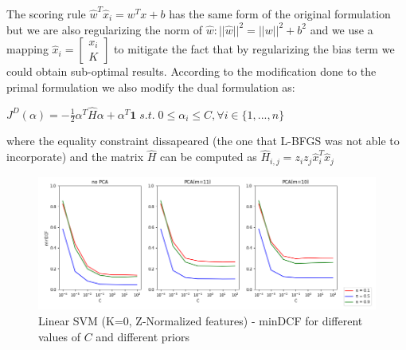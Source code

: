 \documentclass[10pt, a4paper, twocolumn]{article} %
\begin{document}
The scoring rule $\hat{w}^T\hat{x}_i = w^Tx + b$ has the same form of the original formulation but
we are also regularizing the norm of $\hat{w}: ||\hat{w}||^2 = ||w||^2 + b^2$ and we use a mapping
$\hat{x}_i = \begin{bmatrix} x_i\\ K \end{bmatrix}$ to mitigate the fact that by regularizing  the bias
term we could obtain sub-optimal results. According to the modification done to
the primal formulation we also modify the dual formulation as:
\begin{center}
	\begin{math}
		J^D(\alpha)=-\frac{1}{2}\alpha^T\hat{H}\alpha + \alpha^T\textbf{1} \; s.t.\; 0 \le \alpha_i \le C, \forall i\in \{1,...,n\}
	\end{math}
\end{center}
where the equality constraint dissapeared (the one that L-BFGS was not able to incorporate) and the
matrix $\hat{H}$ can be computed as $\hat{H}_{i,j}=z_iz_j\hat{x}_i^T\hat{x}_j$
\begin{figure}[ht!]
	\includegraphics[width=\linewidth]{./Pictures/FeaturesAnalysis/LSVM.png}
	\caption{Linear SVM (K=0, Z-Normalized features) - minDCF for different values of $C$ and different priors}
	\label{lsvm} 
\end{figure}
\end{document}
